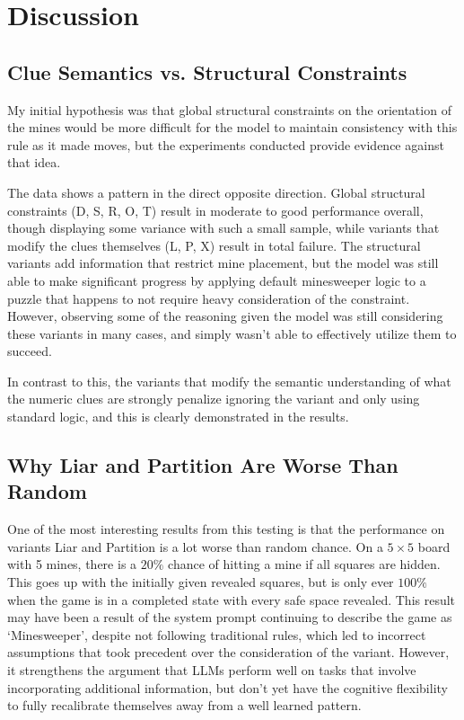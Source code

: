 \documentclass[11pt,conference,compsoc]{IEEEtran}
\begin{document}
\section{Discussion}
\subsection{Clue Semantics vs. Structural Constraints}
My initial hypothesis was that global structural constraints on the orientation of the mines would be more difficult for the model to maintain consistency with this rule as it made moves, but the experiments conducted provide evidence against that idea.

The data shows a pattern in the direct opposite direction. Global structural constraints (D, S, R, O, T) result in moderate to good performance overall, though displaying some variance with such a small sample, while variants that modify the clues themselves (L, P, X) result in total failure. The structural variants add information that restrict mine placement, but the model was still able to make significant progress by applying default minesweeper logic to a puzzle that happens to not require heavy consideration of the constraint. However, observing some of the reasoning given the model was still considering these variants in many cases, and simply wasn't able to effectively utilize them to succeed.

In contrast to this, the variants that modify the semantic understanding of what the numeric clues are strongly penalize ignoring the variant and only using standard logic, and this is clearly demonstrated in the results.

\subsection{Why Liar and Partition Are Worse Than Random}
One of the most interesting results from this testing is that the performance on variants Liar and Partition is a lot worse than random chance. On a $5\times5$ board with 5 mines, there is a $20\%$ chance of hitting a mine if all squares are hidden. This goes up with the initially given revealed squares, but is only ever $100\%$ when the game is in a completed state with every safe space revealed. This result may have been a result of the system prompt continuing to describe the game as `Minesweeper', despite not following traditional rules, which led to incorrect assumptions that took precedent over the consideration of the variant. However, it strengthens the argument that LLMs perform well on tasks that involve incorporating additional information, but don't yet have the cognitive flexibility to fully recalibrate themselves away from a well learned pattern\cite{xu2024puzzlesurvey}.
\end{document}
